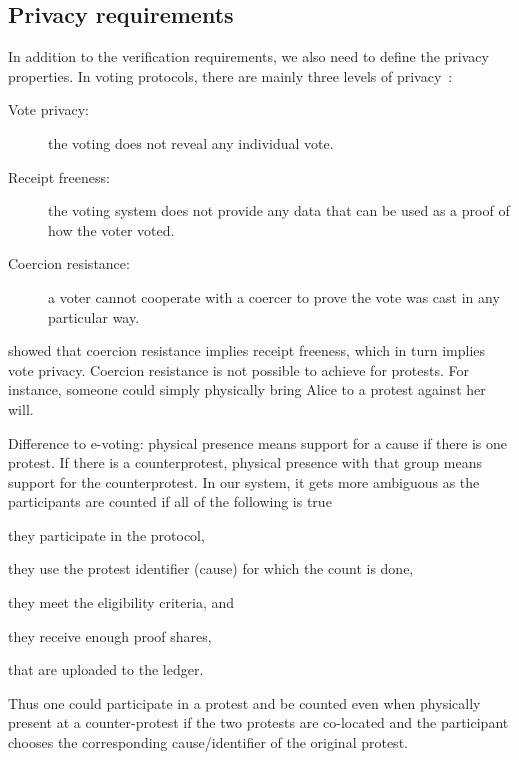 \subsection{Privacy requirements}%
\label{privacy-properties}

In addition to the verification requirements, we also need to define the privacy properties.
In voting protocols, there are mainly three levels of privacy~\cite{VerifyingPrivacyPropertiesOfVotingProtocols}:
\begin{description}
\item[Vote privacy:] the voting does not reveal any individual vote.
\item[Receipt freeness:] the voting system does not provide any data that can be used as a proof of how the voter voted.
\item[Coercion resistance:] a voter cannot cooperate with a coercer to prove the vote was cast in any particular way.
\end{description}

 showed that coercion resistance implies receipt freeness, which in turn implies vote privacy.
Coercion resistance is not possible to achieve for protests.
For instance, someone could simply physically bring Alice to a protest against her will.

Difference to e-voting:
physical presence means support for a cause if there is one protest. If there is a counterprotest, physical presence with that group means support for the counterprotest. In our system, it gets more ambiguous as the participants are counted if all of the following is true
\begin{enumerate*}
\item they participate in the protocol,
\item they use the protest identifier (cause) for which the count is done,
\item they meet the eligibility criteria, and
\item they receive enough proof shares,
\item that are uploaded to the ledger.
\end{enumerate*}
Thus one could participate in a protest and be counted even when physically 
present at a counter-protest if the two protests are co-located and the 
participant chooses the corresponding cause/identifier of the original protest.

